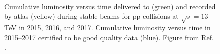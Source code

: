 \begin{figure}[ht]
\centering
{}
\\
\caption{Cumulative luminosity versus time delivered to (green) and recorded by \gls{atlas} (yellow) during stable beams for pp collisions at $\sqrt{s}=13$ TeV in  2015,  2016, 
and  2017.  Cumulative luminosity versus time in 2015--2017 certified to be good quality data (blue). Figure from Ref. \cite{LumiTwiki}.}
\label{fig:atlas:lumi1}
\end{figure}

